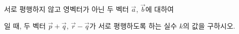 서로 평행하지 않고 영벡터가 아닌 두 벡터 $\vec{a}$, $\vec{b}$에 대하여 \par\smallskip{}\par\smallskip\noindent 일 때, 두 벡터 $\vec{p}+\vec{q}$, $\vec{r}-\vec{q}$가 서로 평행하도록 하는 실수 $k$의 값을 구하시오.
